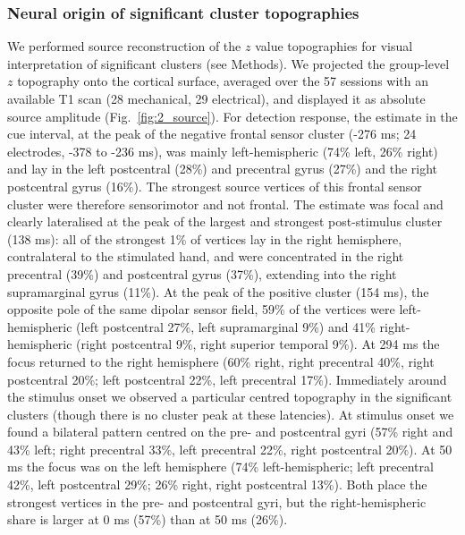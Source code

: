 \documentclass[11pt,a4paper,onecolumn]{article}
\begin{document}
\subsubsection*{Neural origin of significant cluster topographies}
We performed source reconstruction of the $z$ value topographies for visual interpretation of significant clusters (see Methods). We projected the group-level $z$ topography onto the cortical surface, averaged over the 57 sessions with an available T1 scan (28 mechanical, 29 electrical), and displayed it as absolute source amplitude (Fig.~\ref{fig:2_source}). For detection response, the estimate in the cue interval, at the peak of the negative frontal sensor cluster (-276 ms; 24 electrodes, -378 to -236 ms), was mainly left-hemispheric (74\% left, 26\% right) and lay in the left postcentral (28\%) and precentral gyrus (27\%) and the right postcentral gyrus (16\%). The strongest source vertices of this frontal sensor cluster were therefore sensorimotor and not frontal. The estimate was focal and clearly lateralised at the peak of the largest and strongest post-stimulus cluster (138 ms): all of the strongest 1\% of vertices lay in the right hemisphere, contralateral to the stimulated hand, and were concentrated in the right precentral (39\%) and postcentral gyrus (37\%), extending into the right supramarginal gyrus (11\%). At the peak of the positive cluster (154 ms), the opposite pole of the same dipolar sensor field, 59\% of the vertices were left-hemispheric (left postcentral 27\%, left supramarginal 9\%) and 41\% right-hemispheric (right postcentral 9\%, right superior temporal 9\%). At 294 ms the focus returned to the right hemisphere (60\% right, right precentral 40\%, right postcentral 20\%; left postcentral 22\%, left precentral 17\%). 
Immediately around the stimulus onset we observed a particular centred topography in the significant clusters (though there is no cluster peak at these latencies). At stimulus onset we found a bilateral pattern centred on the pre- and postcentral gyri (57\% right and 43\% left; right precentral 33\%, left precentral 22\%, right postcentral 20\%). At 50 ms the focus was on the left hemisphere (74\% left-hemispheric; left precentral 42\%, left postcentral 29\%; 26\% right, right postcentral 13\%). Both place the strongest vertices in the pre- and postcentral gyri, but the right-hemispheric share is larger at 0 ms (57\%) than at 50 ms (26\%).
\end{document}
